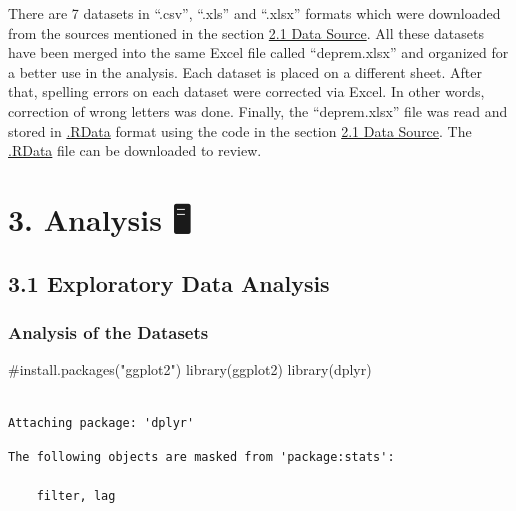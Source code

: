 \documentclass[
  11pt,
  a4paper,
  DIV=11,
  numbers=noendperiod]{scrartcl}
\newenvironment{Shaded}{\begin{snugshade}}{\end{snugshade}}
\newcommand{\CommentTok}[1]{\textcolor[rgb]{0.37,0.37,0.37}{#1}}
\newcommand{\FunctionTok}[1]{\textcolor[rgb]{0.28,0.35,0.67}{#1}}
\newcommand{\NormalTok}[1]{\textcolor[rgb]{0.00,0.23,0.31}{#1}}
\begin{document}
There are 7 datasets in ``.csv'', ``.xls'' and ``.xlsx'' formats which
were downloaded from the sources mentioned in the section
\protect\hyperlink{data-source}{2.1 Data Source}. All these datasets
have been merged into the same Excel file called ``deprem.xlsx'' and
organized for a better use in the analysis. Each dataset is placed on a
different sheet. After that, spelling errors on each dataset were
corrected via Excel. In other words, correction of wrong letters was
done. Finally, the ``deprem.xlsx'' file was read and stored in
\href{https://github.com/emu-hacettepe-analytics/emu660-spring2024-aycacetin/tree/main}{.RData}
format using the code in the section \protect\hyperlink{data-source}{2.1
Data Source}. The
\href{https://github.com/emu-hacettepe-analytics/emu660-spring2024-aycacetin/tree/main}{.RData}
file can be downloaded to review.

\hypertarget{analysis}{%
\section{3. Analysis 🖥️}\label{analysis}}

\hypertarget{exploratory-data-analysis}{%
\subsection{3.1 Exploratory Data
Analysis}\label{exploratory-data-analysis}}

\hypertarget{analysis-of-the-datasets}{%
\subsubsection{Analysis of the
Datasets}\label{analysis-of-the-datasets}}

\begin{Shaded}
\begin{Highlighting}[]
\CommentTok{\#install.packages("ggplot2")}
\FunctionTok{library}\NormalTok{(ggplot2)}
\FunctionTok{library}\NormalTok{(dplyr)}
\end{Highlighting}
\end{Shaded}

\begin{verbatim}

Attaching package: 'dplyr'
\end{verbatim}

\begin{verbatim}
The following objects are masked from 'package:stats':

    filter, lag
\end{verbatim}
\end{document}
